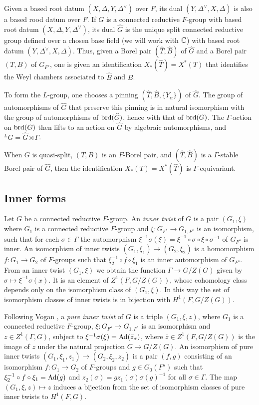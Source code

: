 \documentclass{article}
\theoremstyle{definition}
\numberwithin{equation}{section}
\renewcommand{\-}{\hyp{}}
\begin{document}
Given a based root datum $(X,\Delta,Y,\Delta^\vee)$ over $F$, its dual $(Y,\Delta^\vee,X,\Delta)$ is also a based rood datum over $F$. If $G$ is a connected reductive $F$-group with based root datum $(X,\Delta,Y,\Delta^\vee)$, its dual $\hat G$ is the unique split connected reductive group defined over a chosen base field (we will work with $\mathbb{C}$) with based root datum $(Y,\Delta^\vee,X,\Delta)$. Thus, given a Borel pair $(\hat T,\hat B)$ of $\hat G$ and a Borel pair $(T,B)$ of $G_{F^s}$, one is given an identification $X_*(\hat T)=X^*(T)$ that identifies the Weyl chambers associated to $\hat B$ and $B$.

To form the $L$\-group, one chooses a pinning $(\hat T,\hat B,\{Y_\alpha\})$ of $\hat G$. The group of automorphisms of $\hat G$ that preserve this pinning is in natural isomorphism with the group of automorphisms of $\textrm{brd}(\widehat G)$, hence with that of $\textrm{brd}(G)$. The $\Gamma$-action on $\textrm{brd}(G)$ then lifts to an action on $\hat G$ by algebraic automorphisms, and $^LG=\hat G \rtimes \Gamma$.

When $G$ is quasi-split, $(T,B)$ is an $F$-Borel pair, and $(\hat T,\hat B)$ is a $\Gamma$-stable Borel pair of $\hat G$, then the identification $X_*(T)=X^*(\hat T)$ is $\Gamma$-equivariant.

\subsection{Inner forms}
\label{s:inner}

Let $G$ be a connected reductive $F$-group. An \emph{inner twist} of $G$ is a pair $(G_1,\xi)$ where $G_1$ is a connected reductive $F$-group and $\xi : G_{F^s} \to G_{1,F^s}$ is an isomorphism, such that for each $\sigma \in \Gamma$ the automorphism $\xi^{-1}\sigma(\xi) = \xi^{-1}\circ\sigma\circ\xi\circ\sigma^{-1}$ of $G_{F^s}$ is inner. An isomorphism of inner twists $(G_1,\xi_1) \to (G_2,\xi_2)$ is a homomorphism $f : G_1 \to G_2$ of $F$-groups such that $\xi_2^{-1}\circ f \circ \xi_1$ is an inner automorphism of $G_{F^s}$. From an inner twist $(G_1,\xi)$ we obtain the function $\Gamma \to G/Z(G)$ given by $\sigma \mapsto \xi^{-1}\sigma(x)$. It is an element of $Z^1(F,G/Z(G))$, whose cohomology class depends only on the isomorphism class of $(G_1,\xi)$. In this way the set of isomorphism classes of inner twists is in bijection with $H^1(F,G/Z(G))$.



Following Vogan \cite{Vog93}, a \emph{pure inner twist} of $G$ is a triple $(G_1,\xi,z)$, where $G_1$ is a connected reductive $F$-group, $\xi : G_{F^s} \to G_{1,F^s}$ is an isomorphism and $z \in Z^1(\Gamma,G)$, subject to $\xi^{-1}\sigma(\xi)=\textrm{Ad}(\bar z_\sigma)$, where $\bar z \in Z^1(F,G/Z(G))$ is the image of $z$ under the natural projection $G \to G/Z(G)$. An isomorphism of pure inner twists $(G_1,\xi_1,z_1) \to (G_2,\xi_2,z_2)$ is a pair $(f,g)$ consisting of an isomorphism $f : G_1 \to G_2$ of $F$-groups and $g \in G_0(F^s)$ such that $\xi_2^{-1}\circ f \circ \xi_1=\textrm{Ad}(g)$ and $z_2(\sigma)=gz_1(\sigma)\sigma(g)^{-1}$ for all $\sigma \in \Gamma$. The map $(G_1,\xi,z) \mapsto z$ induces a bijection from the set of isomorphism classes of pure inner twists to $H^1(F,G)$.
\end{document}
